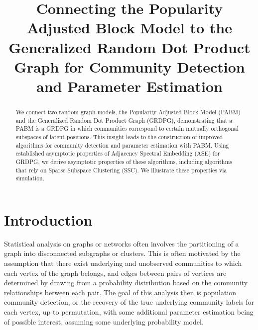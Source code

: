 \documentclass[12pt]{article}
\title{Connecting the Popularity Adjusted Block Model to the Generalized Random
Dot Product Graph for Community Detection and Parameter Estimation}
\author{}
\date{\vspace{-2.5em}}
\def\spacingset#1{\renewcommand{\baselinestretch}%
{#1}\small\normalsize} \spacingset{1}
\providecommand{\tightlist}{%
  \setlength{\itemsep}{0pt}\setlength{\parskip}{0pt}}
\begin{document}
\maketitle
\begin{abstract}
We connect two random graph models, the Popularity Adjusted Block Model
(PABM) and the Generalized Random Dot Product Graph (GRDPG),
demonstrating that a PABM is a GRDPG in which communities correspond to
certain mutually orthogonal subspaces of latent positions. This insight
leads to the construction of improved algorithms for community detection
and parameter estimation with PABM. Using established asymptotic
properties of Adjacency Spectral Embedding (ASE) for GRDPG, we derive
asymptotic properties of these algorithms, including algorithms that
rely on Sparse Subspace Clustering (SSC). We illustrate these properties
via simulation.
\end{abstract}

\providecommand{\tightlist}{%
  \setlength{\itemsep}{0pt}\setlength{\parskip}{0pt}}
\newcommand{\diag}{\mathrm{diag}}
\newcommand{\tr}{\mathrm{Tr}}
\newcommand{\blockdiag}{\mathrm{blockdiag}}
\newcommand{\indep}{\stackrel{\mathrm{ind}}{\sim}}
\newcommand{\iid}{\stackrel{\mathrm{iid}}{\sim}}
\newcommand{\Bernoulli}{\mathrm{Bernoulli}}
\newcommand{\Betadist}{\mathrm{Beta}}
\newcommand{\BG}{\mathrm{BernoulliGraph}}
\newcommand{\PABM}{\mathrm{PABM}}
\newcommand{\RDPG}{\mathrm{RDPG}}
\newcommand{\GRDPG}{\mathrm{GRDPG}}
\newcommand{\Multinomial}{\mathrm{Multinomial}}
\newtheorem{theorem}{Theorem}
\newtheorem{lemma}{Lemma}
\newtheorem{proposition}{Proposition}
\theoremstyle{remark}
\newtheorem*{remark}{Remark}
\theoremstyle{definition}
\newtheorem{definition}{Definition}
\newtheorem*{example}{Example}
\newpage
\spacingset{1.5} %

\hypertarget{introduction}{%
\section{Introduction}\label{introduction}}

Statistical analysis on graphs or networks often involves the
partitioning of a graph into disconnected subgraphs or clusters. This is
often motivated by the assumption that there exist underlying and
unobserved communities to which each vertex of the graph belongs, and
edges between pairs of vertices are determined by drawing from a
probability distribution based on the community relationships between
each pair. The goal of this analysis then is population community
detection, or the recovery of the true underlying community labels for
each vertex, up to permutation, with some additional parameter
estimation being of possible interest, assuming some underlying
probability model. 
\end{document}
